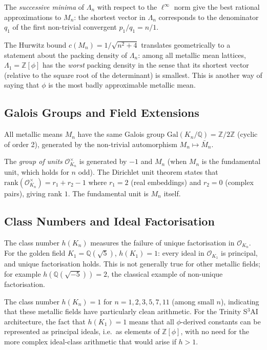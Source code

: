 The \emph{successive minima} of $\Lambda_n$ with
respect to the $\ell^\infty$ norm give the best
rational approximations to $M_n$: the shortest
vector in $\Lambda_n$ corresponds to the
denominator $q_1$ of the first non-trivial
convergent $p_1/q_1 = n/1$.

The Hurwitz bound $c(M_n) = 1/\sqrt{n^2+4}$
translates geometrically to a statement about the
packing density of $\Lambda_n$: among all metallic
mean lattices, $\Lambda_1 = \mathbb{Z}[\phi]$ has
the \emph{worst} packing density in the sense that
its shortest vector (relative to the square root
of the determinant) is smallest.  This is another
way of saying that $\phi$ is the most badly
approximable metallic mean.

\subsection{Galois Groups and Field Extensions}
\label{subsec:galois}

All metallic means $M_n$ have the same Galois group
$\mathrm{Gal}(K_n/\mathbb{Q}) = \mathbb{Z}/2\mathbb{Z}$
(cyclic of order 2), generated by the non-trivial
automorphism $M_n \mapsto \bar{M}_n$.

The \emph{group of units} $\mathcal{O}_{K_n}^\times$
is generated by $-1$ and $M_n$ (when $M_n$ is the
fundamental unit, which holds for $n$ odd).
The Dirichlet unit theorem states that
$\mathrm{rank}(\mathcal{O}_{K_n}^\times) = r_1 + r_2 - 1$
where $r_1 = 2$ (real embeddings) and $r_2 = 0$
(complex pairs), giving rank $1$.  The fundamental
unit is $M_n$ itself.

\subsection{Class Numbers and Ideal Factorisation}
\label{subsec:class-numbers}

The class number $h(K_n)$ measures the failure of
unique factorisation in $\mathcal{O}_{K_n}$.
For the golden field $K_1 = \mathbb{Q}(\sqrt{5})$,
$h(K_1) = 1$: every ideal in $\mathcal{O}_{K_1}$
is principal, and unique factorisation holds.
This is not generally true for other metallic
fields; for example $h(\mathbb{Q}(\sqrt{-5})) = 2$,
the classical example of non-unique factorisation.

The class number $h(K_n) = 1$ for
$n = 1, 2, 3, 5, 7, 11$ (among small $n$),
indicating that these metallic fields have
particularly clean arithmetic.  For the Trinity
S$^3$AI architecture, the fact that
$h(K_1) = 1$ means that all $\phi$-derived
constants can be represented as principal ideals,
i.e.\ as elements of $\mathbb{Z}[\phi]$, with no
need for the more complex ideal-class arithmetic
that would arise if $h > 1$.

